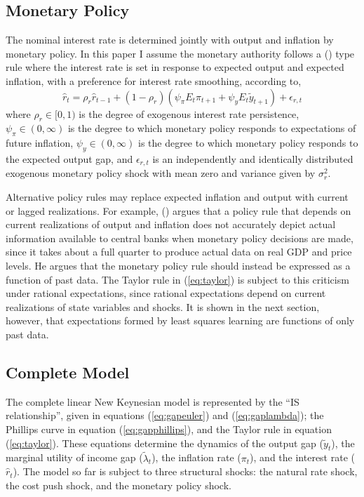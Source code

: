 \documentclass[12pt]{article}
\newcommand{\beq}{\begin{equation}}
\newcommand{\eeq}{\end{equation}}
\newcommand{\citee}[1]{\citename{#1} (\citeyear{#1})}
\newcommand{\h}[1]{\hat{#1}}
\begin{document}
\subsection{Monetary Policy}
The nominal interest rate is determined jointly with output and inflation by monetary policy.  In this paper I assume the monetary authority follows a \citee{taylor1993} type rule where the interest rate is set in response to expected output and expected inflation, with a preference for interest rate smoothing, according to,
\beq \label{eq:taylor} \h{r}_t = \rho_r \h{r}_{t-1} + (1-\rho_r) \left(\psi_{\pi} E_t \pi_{t+1} + \psi_y E_t \tilde{y}_{t+1} \right) + \epsilon_{r,t} \eeq
where $\rho_r \in [0,1)$ is the degree of exogenous interest rate persistence, $\psi_{\pi} \in (0,\infty)$ is the degree to which monetary policy responds to expectations of future inflation, $\psi_y \in (0,\infty)$ is the degree to which monetary policy responds to the expected output gap, and $\epsilon_{r,t}$ is an independently and identically distributed exogenous monetary policy shock with mean zero and variance given by $\sigma_r^2$.  

Alternative policy rules may replace expected inflation and output with current or lagged realizations.  For example, \citee{mccallum1997} argues that a policy rule that depends on current realizations of output and inflation does not accurately depict actual information available to central banks when monetary policy decisions are made, since it takes about a full quarter to produce actual data on real GDP and price levels.  He argues that the monetary policy rule should instead be expressed as a function of past data.  The Taylor rule in (\ref{eq:taylor}) is subject to this criticism under rational expectations, since rational expectations depend on current realizations of state variables and shocks.  It is shown in the next section, however, that expectations formed by least squares learning are functions of only past data.

\subsection{Complete Model}
The complete linear New Keynesian model is represented by the ``IS relationship'', given in equations (\ref{eq:gapeuler}) and (\ref{eq:gaplambda}); the Phillips curve in equation (\ref{eq:gapphillips}), and the Taylor rule in equation (\ref{eq:taylor}).  These equations determine the dynamics of the output gap ($\tilde{y}_t$), the marginal utility of income gap ($\tilde{\lambda}_t$), the inflation rate ($\pi_t$), and the interest rate ($\h{r}_t$).  The model so far is subject to three structural shocks: the natural rate shock, the cost push shock, and the monetary policy shock.
\end{document}
